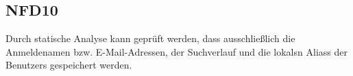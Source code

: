 \subsection*{NFD10}
Durch \gls{statische Analyse} kann geprüft werden, dass ausschließlich die Anmeldenamen bzw. E-Mail-Adressen, der \Gls{Suchverlauf} und die \glspl{lokal}n \Glspl{Alias} der \Glspl{Benutzer} gespeichert werden.